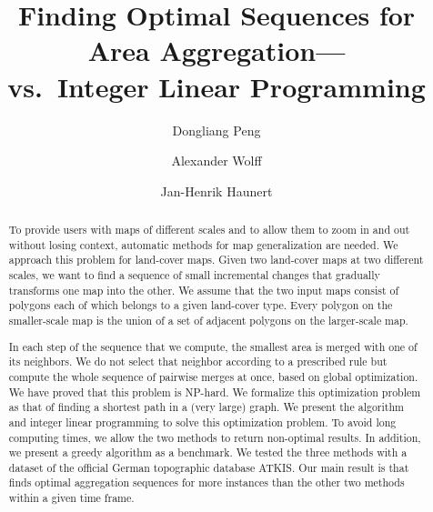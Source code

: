 \documentclass[acmsmall,natbib=false]{acmart}
\begin{document}
\title
[Finding Optimal Sequences for Area Aggregation] %
{Finding Optimal Sequences for Area Aggregation---\texorpdfstring
    {\protect\\ \Astar vs.\ Integer Linear Programming} %
    {A* vs.\ Integer Linear Programming} %
}
    


\author{Dongliang Peng}

\author{Alexander Wolff}

\author{Jan-Henrik Haunert}


\begin{abstract}
To provide users with maps of different scales and 
to allow them to zoom in and out without losing context,
automatic methods for map generalization are needed.
We approach this problem for land-cover maps.
Given two land-cover maps at two different scales, 
we want to find a sequence of small incremental
changes that gradually transforms one map into the other.
We assume that the two input maps consist of polygons 
each of which belongs to a given land-cover type. 
Every polygon on the smaller-scale map
is the union of a set of adjacent polygons 
on the larger-scale map. 

In each step of the sequence that we compute, 
the smallest area is merged with one of its neighbors. 
We do not select that neighbor according to a prescribed rule 
but compute the whole sequence of pairwise merges at once, 
based on global optimization.
We have proved that this problem is NP-hard.
We formalize this optimization problem as that of 
finding a shortest path in a (very large) graph.
We present the \Astar algorithm and integer linear programming
to solve this optimization problem.
To avoid long computing times, we allow the two methods to 
return non-optimal results.
In addition, we present a greedy algorithm as a benchmark.
We tested the three methods with a
dataset of the official German topographic database ATKIS.
Our main result is that
\Astar finds optimal aggregation sequences for more instances 
than the other two methods
within a given time frame.
%
%
\end{abstract}
\end{document}
